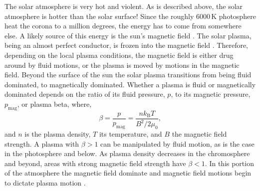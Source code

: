  
The solar atmosphere is very hot and violent.
As is described above, the solar atmosphere is hotter than the solar surface!
Since the roughly 6000\,K photosphere  heat the corona to a million degrees, the energy has to come from somewhere else. 
A likely source of this energy is the sun's magnetic field \citep{Priest2014}.
The solar plasma, being an almost perfect conductor, is frozen into the magnetic field \citep{Priest2014}.
Therefore, depending on the local plasma conditions, the magnetic field is either drug around by fluid motions, or the plasma is moved by motions in the magnetic field.
Beyond the surface of the sun the solar plasma transitions from being fluid dominated, to magnetically dominated.
Whether a plasma is fluid or magnetically dominated depends on the ratio of its fluid pressure, $p$, to its magnetic pressure, $p_\text{mag}$, or plasma beta, where,
\begin{equation}
	\beta = \frac{p}{p_\text{mag}} = \frac{nk_\text{B}T}{B^2 / 2\mu_0},
\end{equation}
and $n$ is the plasma density, $T$ its temperature, and $B$ the magnetic field strength.
A plasma with $\beta>1$ can be manipulated by fluid motion, as is the case in the photosphere and below.
As plasma density decreases in the chromosphere and beyond, areas with strong magnetic field strength have $\beta<1$.  
In this portion of the atmosphere the magnetic field dominate and magnetic field motions begin to dictate plasma motion \citep{Priest2014}.

